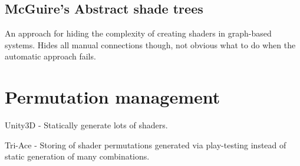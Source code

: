 \subsection{McGuire's Abstract shade trees}

An approach for hiding the complexity of creating shaders in graph-based systems. Hides all manual connections though, not obvious what to do when the automatic approach fails.

\section{Permutation management}

Unity3D - Statically generate lots of shaders.

Tri-Ace - Storing of shader permutations generated via play-testing instead of static generation of many combinations.
